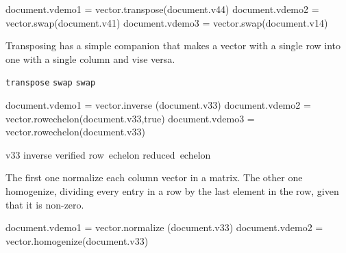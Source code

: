 \typebuffer[option=TEX] \getbuffer

\startlinecorrection
{} {\hbox{}}
  {} {\hbox{}}
  {} {\hbox{}}
\stopcombination
\stoplinecorrection

\startbuffer
\startluacode
document.vdemo1 = vector.transpose(document.v44)
document.vdemo2 = vector.swap(document.v41)
document.vdemo3 = vector.swap(document.v14)
\stopluacode
\stopbuffer

\typebuffer[option=TEX] \getbuffer

Transposing has a simple companion that makes a vector with a single row into one
with a single column and vise versa.

\startlinecorrection
{} {}
    {} {\hbox{\tt transpose}}
    {} {}
    {} {\hbox{\tt swap}}
    {} {}
    {} {\hbox{\tt swap}}
\stopcombination
\stoplinecorrection

\startbuffer
\startluacode
document.vdemo1 = vector.inverse   (document.v33)
document.vdemo2 = vector.rowechelon(document.v33,true)
document.vdemo3 = vector.rowechelon(document.v33)
\stopluacode
\stopbuffer

\typebuffer[option=TEX] \getbuffer

\startlinecorrection
{}              {\hbox {v33}}
    {}              {\hbox {inverse}}
    {} {\hbox {verified}}
    {}              {\hbox {row echelon}}
    {}              {\hbox {reduced echelon}}
\stopcombination
\stoplinecorrection

The first one normalize each column vector in a matrix. The other one homogenize,
dividing every entry in a row by the last element in the row, given that it is
non-zero.

\startbuffer
\startluacode
document.vdemo1 = vector.normalize (document.v33)
document.vdemo2 = vector.homogenize(document.v33)
\stopluacode
\stopbuffer

